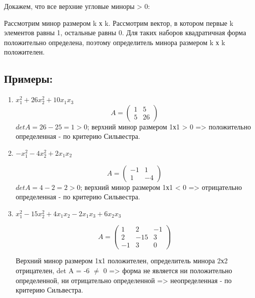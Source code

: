 \documentclass[12pt]{article}
\begin{document}
Докажем, что все верхние угловые миноры > 0:

Рассмотрим минор размером k х k. Рассмотрим вектор, в котором первые k элементов равны 1, остальные равны 0. Для таких наборов квадратичная форма положительно определена, поэтому определитель минора размером k х k положителен.

\subsection{Примеры:}

\begin{enumerate}
    \item $x^2_{1} + 26x^2_{2} + 10x_{1}x_{3}$
          \[
              A = \left(
              \begin{array}{rrr}
                      1 & 5  \\
                      5 & 26
                  \end{array}
              \right)
          \]
          $det A = 26 - 25 = 1 > 0$; верхний минор размером 1х1 > 0 => положительно определенная - по критерию Сильвестра.

    \item $-x^2_{1} - 4x^2_{2} + 2x_{1}x_{2}$

          \[
              A = \left(
              \begin{array}{rrr}
                      -1 & 1  \\
                      1  & -4
                  \end{array}
              \right)
          \]
          $det A = 4 - 2 = 2 > 0$; верхний минор размером 1х1 < 0 => отрицательно определенная - по критерию Сильвестра.
    \item $x^2_{1} - 15x^2_{2} + 4x_{1}x_{2} - 2x_{1} x_{3} + 6x_{2} x_{3}$

          \[A = \left(
              \begin{array}{rrr}
                      1  & 2   & -1 \\
                      2  & -15 & 3  \\
                      -1 & 3   & 0
                  \end{array}
              \right)\]

          Верхний минор размером 1х1 положителен, определитель минора 2х2 отрицателен, det A = -6 $\neq$ 0 => форма не является ни положительно определенной, ни отрицательно определенной => неопределенная - по критерию Сильвестра.
\end{enumerate}
\end{document}
